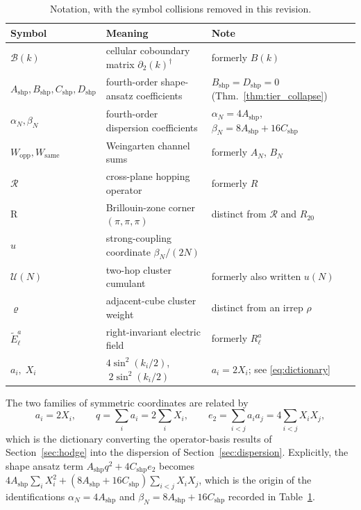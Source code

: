\documentclass[11pt,a4paper]{article}
\theoremstyle{definition}
\newcommand{\dg}{^{\dagger}}
\newcommand{\Bc}{\mathcal{B}}          %
\newcommand{\Rc}{\mathcal{R}}          %
\newcommand{\Utwo}{\mathcal{U}}        %
\newcommand{\Ashp}{A_{\mathrm{shp}}}
\newcommand{\Bshp}{B_{\mathrm{shp}}}
\newcommand{\Cshp}{C_{\mathrm{shp}}}
\newcommand{\Dshp}{D_{\mathrm{shp}}}
\newcommand{\Wopp}{W_{\mathrm{opp}}}
\newcommand{\Wsame}{W_{\mathrm{same}}}
\begin{document}
\begin{table}[htbp]
\centering
\caption{Notation, with the symbol collisions removed in this revision.}\label{tab:notation}
\vspace{0.4em}
\small
\begin{tabular}{@{}llp{5.8cm}@{}}
\toprule
Symbol & Meaning & Note \\
\midrule
$\Bc(k)$ & cellular coboundary matrix $\partial_2(k)\dg$ & formerly $B(k)$ \\
$\Ashp,\Bshp,\Cshp,\Dshp$ & fourth-order shape-ansatz coefficients & $\Bshp=\Dshp=0$ (Thm.~\ref{thm:tier_collapse}) \\
$\alpha_N,\beta_N$ & fourth-order dispersion coefficients & $\alpha_N = 4\Ashp$, $\beta_N = 8\Ashp + 16\Cshp$ \\
$\Wopp,\Wsame$ & Weingarten channel sums & formerly $A_N$, $B_N$ \\
$\Rc$ & cross-plane hopping operator & formerly $R$ \\
$\mathrm{R}$ & Brillouin-zone corner $(\pi,\pi,\pi)$ & distinct from $\Rc$ and $R_{20}$ \\
$u$ & strong-coupling coordinate $\beta_N/(2N)$ & \\
$\Utwo(N)$ & two-hop cluster cumulant & formerly also written $u(N)$ \\
$\varrho$ & adjacent-cube cluster weight & distinct from an irrep $\rho$ \\
$\tilde E^a_\ell$ & right-invariant electric field & formerly $R^a_\ell$ \\
$a_i,\;X_i$ & $4\sin^2(k_i/2)$, $\;2\sin^2(k_i/2)$ & $a_i = 2X_i$; see \eqref{eq:dictionary} \\
\bottomrule
\end{tabular}
\end{table}

The two families of symmetric coordinates are related by
\begin{equation}\label{eq:dictionary}
  a_i = 2X_i, \qquad q = \sum_i a_i = 2\sum_i X_i, \qquad e_2 = \sum_{i<j}a_ia_j = 4\sum_{i<j}X_iX_j,
\end{equation}
which is the dictionary converting the operator-basis results of Section~\ref{sec:hodge} into the dispersion of Section~\ref{sec:dispersion}. Explicitly, the shape ansatz term $\Ashp q^2 + 4\Cshp e_2$ becomes $4\Ashp\sum_i X_i^2 + (8\Ashp + 16\Cshp)\sum_{i<j}X_iX_j$, which is the origin of the identifications $\alpha_N = 4\Ashp$ and $\beta_N = 8\Ashp + 16\Cshp$ recorded in Table~\ref{tab:notation}.
\end{document}
